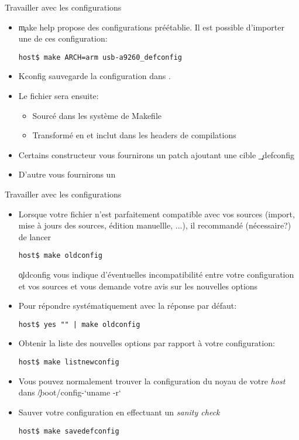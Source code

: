 \begin{frame}[fragile=singleslide]{Travailler avec les configurations}
  \begin{itemize} 
  \item \c{make  help} propose des configurations  préétablie. Il est
    possible d'importer une de ces configuration:
    \begin{lstlisting} 
host$ make ARCH=arm usb-a9260_defconfig
    \end{lstlisting} 
  \item Kconfig sauvegarde la configuration dans . 
  \item Le fichier  sera ensuite:
    \begin{itemize} 
    \item Sourcé dans les système de Makefile
    \item Transformé  en  et inclut
      dans les headers de compilations
    \end{itemize} 
  \item Certains  constructeur vous  fournirons un patch  ajoutant une
    cible \c{_defconfig}
  \item D'autre vous fournirons un 
\end{itemize} 
\end{frame} 

\begin{frame}[fragile=singleslide]{Travailler avec les configurations}
  \begin{itemize} 
  \item  Lorsque  votre   fichier    n'est  parfaitement
    compatible  avec vos sources  (import, mise  à jours  des sources,
    édition manuellle, ...), il recommandé (nécessaire?) de lancer
    \begin{lstlisting} 
host$ make oldconfig
    \end{lstlisting} 
    \c{oldconfig}  vous  indique  d'éventuelles incompatibilité  entre
    votre configuration et vos sources  et vous demande votre avis sur
    les nouvelles options
  \item Pour répondre systématiquement avec la réponse par défaut:
    \begin{lstlisting} 
host$ yes "" | make oldconfig
    \end{lstlisting} 
  \item Obtenir  la liste  des nouvelles options  par rapport  à votre
    configuration:
   \begin{lstlisting} 
host$ make listnewconfig
   \end{lstlisting} 
 \item Vous  pouvez normalement trouver  la configuration du  noyau de
   votre \emph{host} dans \c{/boot/config-`uname -r`}
 \item Sauver votre configuration en effectuant un \emph{sanity check}
   \begin{lstlisting}  
host$ make savedefconfig
   \end{lstlisting} 
 \end{itemize}
\end{frame} 

